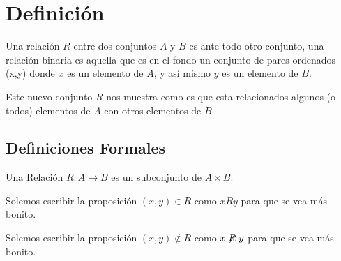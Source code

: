 \documentclass[12pt]{report}                                    %
\begin{document}
    \section{Definición}

        Una relación $R$ entre dos conjuntos $A$ y $B$ es ante todo otro conjunto, una relación binaria es aquella
        que es en el fondo un conjunto de pares ordenados (x,y) donde $x$ es un elemento de $A$, y así mismo
        $y$ es un elemento de $B$.

        Este nuevo conjunto $R$ nos muestra como es que esta relacionados algunos (o todos) elementos de $A$ con
        otros elementos de $B$.



        \subsection*{Definiciones Formales}

            Una Relación $R: A \to B$ es un subconjunto de $A \times B$.

            Solemos escribir la proposición $(x, y) \in R$ como $x R y$ para que se vea más bonito.

            Solemos escribir la proposición $(x, y) \notin R$ como $x\centernot{R}y$ para que se vea más bonito.
\end{document}
